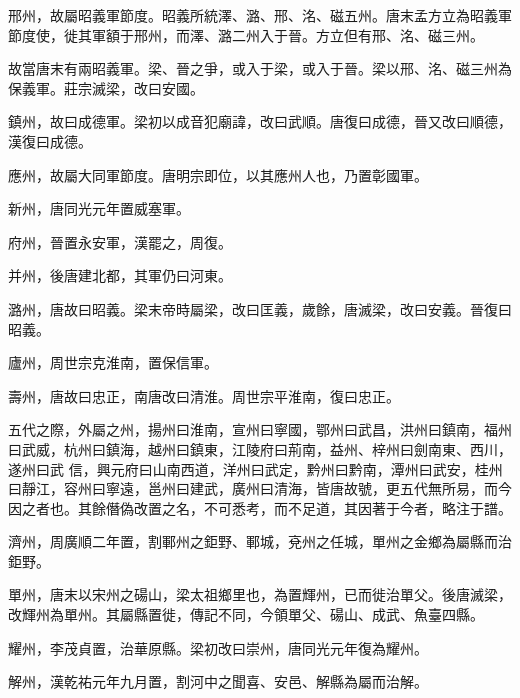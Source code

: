 \begin{pinyinscope}
 邢州，故屬昭義軍節度。昭義所統澤、潞、邢、洺、磁五州。唐末孟方立為昭義軍節度使，徙其軍額于邢州，而澤、潞二州入于晉。方立但有邢、洺、磁三州。



 故當唐末有兩昭義軍。梁、晉之爭，或入于梁，或入于晉。梁以邢、洺、磁三州為保義軍。莊宗滅梁，改曰安國。



 鎮州，故曰成德軍。梁初以成音犯廟諱，改曰武順。唐復曰成德，晉又改曰順德，漢復曰成德。



 應州，故屬大同軍節度。唐明宗即位，以其應州人也，乃置彰國軍。



 新州，唐同光元年置威塞軍。



 府州，晉置永安軍，漢罷之，周復。



 并州，後唐建北都，其軍仍曰河東。



 潞州，唐故曰昭義。梁末帝時屬梁，改曰匡義，歲餘，唐滅梁，改曰安義。晉復曰昭義。



 廬州，周世宗克淮南，置保信軍。



 壽州，唐故曰忠正，南唐改曰清淮。周世宗平淮南，復曰忠正。



 五代之際，外屬之州，揚州曰淮南，宣州曰寧國，鄂州曰武昌，洪州曰鎮南，福州曰武威，杭州曰鎮海，越州曰鎮東，江陵府曰荊南，益州、梓州曰劍南東、西川，遂州曰武
 信，興元府曰山南西道，洋州曰武定，黔州曰黔南，潭州曰武安，桂州曰靜江，容州曰寧遠，邕州曰建武，廣州曰清海，皆唐故號，更五代無所易，而今因之者也。其餘僭偽改置之名，不可悉考，而不足道，其因著于今者，略注于譜。



 濟州，周廣順二年置，割鄆州之鉅野、鄆城，兗州之任城，單州之金鄉為屬縣而治鉅野。



 單州，唐末以宋州之碭山，梁太祖鄉里也，為置輝州，已而徙治單父。後唐滅梁，改輝州為單州。其屬縣置徙，傳記不同，今領單父、碭山、成武、魚臺四縣。



 耀州，李茂貞置，治華原縣。梁初改曰崇州，唐同光元年復為耀州。



 解州，漢乾祐元年九月置，割河中之聞喜、安邑、解縣為屬而治解。




\end{pinyinscope}
